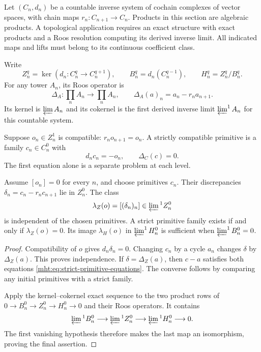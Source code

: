 Let $(C_n,d_n)$ be a countable inverse system of cochain complexes
of vector spaces, with chain maps $r_n:C_{n+1}\to C_n$. Products
in this section are algebraic products. A topological application
requires an exact structure with exact products and a Roos
resolution computing its derived inverse limit. All indicated maps
and lifts must belong to its continuous coefficient class.

Write
\[
 Z^q_n=\ker(d_n:C_n^q\to C_n^{q+1}),\qquad
 B^q_n=d_n(C_n^{q-1}),\qquad H^q_n=Z^q_n/B^q_n.
\]
For any tower $A_n$, its Roos operator is
\[
 \Delta_A:\prod_n A_n\longrightarrow\prod_n A_n,
 \qquad \Delta_A(a)_n=a_n-r_na_{n+1}.
\]
Its kernel is $\varprojlim A_n$ and its cokernel is the first
derived inverse limit $\varprojlim^1 A_n$ for this countable
system.

Suppose $o_n\in Z^1_n$ is compatible: $r_no_{n+1}=o_n$.
A strictly compatible primitive is a family $c_n\in C_n^0$ with
\begin{equation}\label{mht:eq:strict-primitive-equations}
 d_nc_n=-o_n,\qquad \Delta_C(c)=0.
\end{equation}
The first equation alone is a separate problem at each level.

\begin{theorem}\label{mht:thm:strict-primitive-tower}
Assume $[o_n]=0$ for every $n$, and choose primitives $c_n$.
Their discrepancies $\delta_n=c_n-r_nc_{n+1}$ lie in $Z^0_n$.
The class
\begin{equation}\label{mht:eq:strict-primitive-class}
 \lambda_Z(o)=[(\delta_n)_n]\in\varprojlim{}^1 Z^0_n
\end{equation}
is independent of the chosen primitives. A strict primitive family
exists if and only if $\lambda_Z(o)=0$.
Its image $\lambda_H(o)$ in $\varprojlim^1 H^0_n$ is sufficient
when $\varprojlim^1 B^0_n=0$.
\end{theorem}

\begin{proof}
Compatibility of $o$ gives $d_n\delta_n=0$.
Changing $c_n$ by a cycle $a_n$ changes $\delta$ by
$\Delta_Z(a)$. This proves independence. If
$\delta=\Delta_Z(a)$, then $c-a$ satisfies both equations
\eqref{mht:eq:strict-primitive-equations}. The converse follows
by comparing any initial primitives with a strict family.

Apply the kernel--cokernel exact sequence to the two product rows
of $0\to B^0_n\to Z^0_n\to H^0_n\to0$ and their Roos operators.
It contains
\[
 \varprojlim{}^1 B^0_n\longrightarrow
 \varprojlim{}^1 Z^0_n\longrightarrow
 \varprojlim{}^1 H^0_n\longrightarrow0.
\]
The first vanishing hypothesis therefore makes the last map an
isomorphism, proving the final assertion.
\end{proof}


